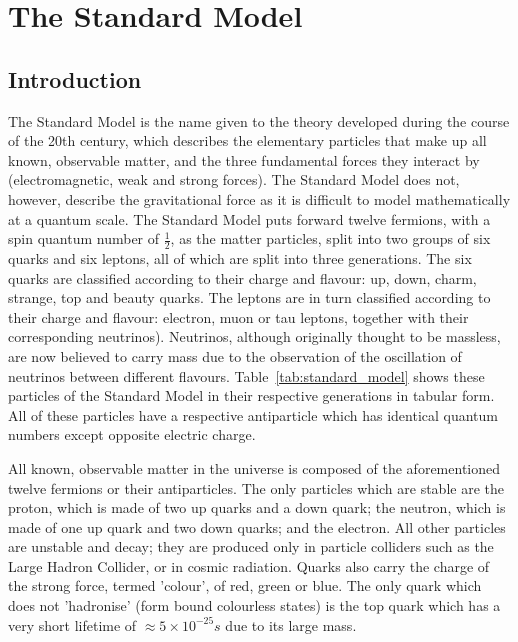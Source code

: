 \chapter{The Standard Model}
\label{c:the_standard_model}

\section{Introduction}
\label{s:standard_model_intro}

The Standard Model is the name given to the theory developed during the course of the 20th century, which
describes the elementary particles that make up all known, observable matter, and the three fundamental forces
they interact by (electromagnetic, weak and strong forces). The Standard Model does not, however, describe the
gravitational force as it is difficult to model mathematically at a quantum scale.
The Standard Model puts forward twelve fermions, with a spin quantum number of $\frac{1}{2}$, as the matter
particles, split into two groups of six quarks and six leptons, all of which are split into three generations.
The six quarks are classified according to their charge and flavour: up, down, charm, strange, top and beauty
quarks. The leptons are in turn classified according to their charge and flavour: electron, muon or tau
leptons, together with their corresponding neutrinos). Neutrinos, although originally thought to be massless,
are now believed to carry mass due to the observation of the oscillation of neutrinos between different
flavours. Table~\ref{tab:standard_model} shows these particles of the Standard Model in their respective
generations in tabular form. All of these particles have a respective antiparticle which has identical quantum
numbers except opposite electric charge.



All known, observable matter in the universe is composed of the aforementioned twelve fermions or their
antiparticles. The only particles which are stable are the proton, which is made of two up quarks and a down
quark; the neutron, which is made of one up quark and two down quarks; and the electron. All other particles
are unstable and decay; they are produced only in particle colliders such as the Large Hadron Collider, or in
cosmic radiation. Quarks also carry the charge of the strong force, termed 'colour', of red, green or blue.
The only quark which does not 'hadronise' (form bound colourless states) is the top quark which has a
very short lifetime of $\approx 5 \times 10^{-25}s$ \cite{Agashe:2014kda} due to its large mass.

